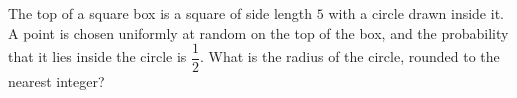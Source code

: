 The top of a square box is a square of side length $5$ with a circle drawn inside it. A point is chosen uniformly at random on the top of the box, and the probability that it lies inside the circle is $\dfrac12$. What is the radius of the circle, rounded to the nearest integer?
